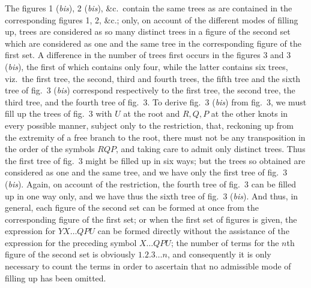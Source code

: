 \documentclass[12pt,a4paper]{article}
\theoremstyle{plain}
\begin{document}
The figures 1 (\textit{bis}), 2 (\textit{bis}), \&c.\ contain the same trees as are contained in the corresponding figures 1, 2, \&c.; only, on account of the different modes of filling up, trees are considered as so many distinct trees in a figure of the second set which are considered as one and the same tree in the corresponding figure of the first set. A difference in the number of trees first occurs in the figures 3 and 3 (\textit{bis}), the first of which contains only four, while the latter contains six trees, viz.\ the first tree, the second, third and fourth trees, the fifth tree and the sixth tree of fig.~3 (\textit{bis}) correspond respectively to the first tree, the second tree, the third tree, and the fourth tree of fig.~3. To derive fig.~3 (\textit{bis}) from fig.~3, we must fill up the trees of fig.~3 with $U$ at the root and $R,Q,P$ at the other knots in every possible manner, subject only to the restriction, that, reckoning up from the extremity of a free branch to the root, there must not be any transposition in the order of the symbols $RQP$, and taking care to admit only distinct trees. Thus the first tree of fig.~3 might be filled up in six ways; but the trees so obtained are considered as one and the same tree, and we have only the first tree of fig.~3 (\textit{bis}). Again, on account of the restriction, the fourth tree of fig.~3 can be filled up in one way only, and we have thus the sixth tree of fig.~3 (\textit{bis}). And thus, in general, each figure of the second set can be formed at once from the corresponding figure of the first set; or when the first set of figures is given, the expression for $YX\ldots QPU$ can be formed directly without the assistance of the expression for the preceding symbol $X\ldots QPU$; the number of terms for the $n$th figure of the second set is obviously $1.2.3\ldots n$, and consequently it is only necessary to count the terms in order to ascertain that no admissible mode of filling up has been omitted.

\medskip
\end{document}
